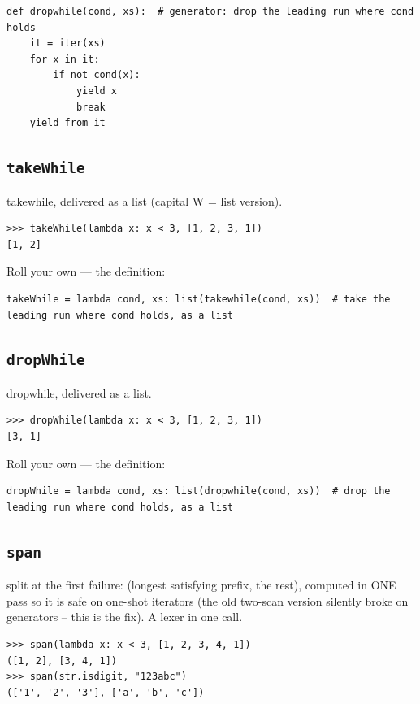 \documentclass[10pt,letterpaper]{book}
\begin{document}
\begin{lstlisting}[style=ex]
def dropwhile(cond, xs):  # generator: drop the leading run where cond holds
    it = iter(xs)
    for x in it:
        if not cond(x):
            yield x
            break
    yield from it
\end{lstlisting}
\subsection{\texttt{takeWhile}}\label{def:takeWhile}
takewhile, delivered as a list (capital W = list version).
\begin{lstlisting}[style=ex]
>>> takeWhile(lambda x: x < 3, [1, 2, 3, 1])
[1, 2]
\end{lstlisting}

Roll your own --- the definition:

\begin{lstlisting}[style=ex]
takeWhile = lambda cond, xs: list(takewhile(cond, xs))  # take the leading run where cond holds, as a list
\end{lstlisting}
\subsection{\texttt{dropWhile}}\label{def:dropWhile}
dropwhile, delivered as a list.
\begin{lstlisting}[style=ex]
>>> dropWhile(lambda x: x < 3, [1, 2, 3, 1])
[3, 1]
\end{lstlisting}

Roll your own --- the definition:

\begin{lstlisting}[style=ex]
dropWhile = lambda cond, xs: list(dropwhile(cond, xs))  # drop the leading run where cond holds, as a list
\end{lstlisting}
\subsection{\texttt{span}}\label{def:span}
split at the first failure: (longest satisfying prefix, the rest), computed in ONE pass so it is safe on one-shot iterators (the old two-scan version silently broke on generators -- this is the fix). A lexer in one call.
\begin{lstlisting}[style=ex]
>>> span(lambda x: x < 3, [1, 2, 3, 4, 1])
([1, 2], [3, 4, 1])
>>> span(str.isdigit, "123abc")
(['1', '2', '3'], ['a', 'b', 'c'])
\end{lstlisting}
\end{document}
